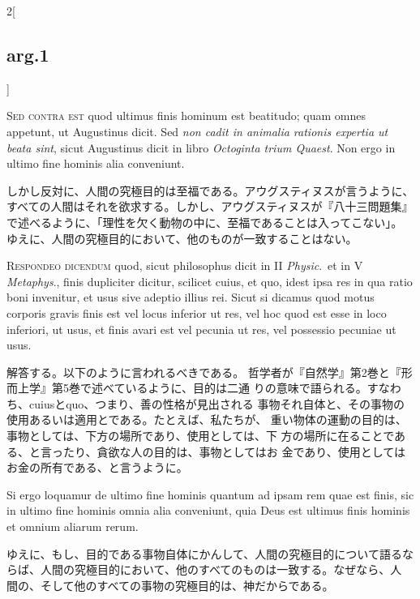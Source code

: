 \documentclass[paper=a4paper,fontsize=10pt,jafontsize=9pt,titlepage]{jlreq}
\begin{document}
\begin{paracol}{2}[\subsection{arg.1}]
\switchcolumn*[\subsection{s.c.}]

{\scshape Sed contra est} quod ultimus finis
hominum est beatitudo; quam omnes appetunt, ut Augustinus dicit. Sed {\itshape non
cadit in animalia rationis expertia ut beata sint}, sicut Augustinus
dicit in libro {\itshape Octoginta trium Quaest}. Non ergo in ultimo fine hominis
alia conveniunt.

\switchcolumn

しかし反対に、人間の究極目的は至福である。アウグスティヌスが言うように、
 すべての人間はそれを欲求する。しかし、アウグスティヌスが『八十三問題集』
 で述べるように、「理性を欠く動物の中に、至福であることは入ってこない」。
 ゆえに、人間の究極目的において、他のものが一致することはない。


{\scshape Respondeo dicendum} quod, sicut philosophus
dicit in II {\itshape Physic}.~et in V {\itshape Metaphys}., finis dupliciter dicitur,
scilicet cuius, et quo, idest ipsa res in qua ratio boni invenitur, et
usus sive adeptio illius rei. Sicut si dicamus quod motus corporis
gravis finis est vel locus inferior ut res, vel hoc quod est esse in
loco inferiori, ut usus, et finis avari est vel pecunia ut res, vel
possessio pecuniae ut usus.

\switchcolumn

解答する。以下のように言われるべきである。
哲学者が『自然学』第2巻と『形而上学』第5巻で述べているように、目的は二通
 りの意味で語られる。すなわち、cuiusとquo、つまり、善の性格が見出される
 事物それ自体と、その事物の使用あるいは適用とである。たとえば、私たちが、
重い物体の運動の目的は、事物としては、下方の場所であり、使用としては、下
 方の場所に在ることである、と言ったり、貪欲な人の目的は、事物としてはお
 金であり、使用としてはお金の所有である、と言うように。

\switchcolumn*

Si ergo loquamur de ultimo fine hominis
quantum ad ipsam rem quae est finis, sic in ultimo fine hominis omnia
alia conveniunt, quia Deus est ultimus finis hominis et omnium aliarum
rerum.

\switchcolumn

ゆえに、もし、目的である事物自体にかんして、人間の究極目的について語るな
 らば、人間の究極目的において、他のすべてのものは一致する。なぜなら、人
 間の、そして他のすべての事物の究極目的は、神だからである。


\end{paracol}
\end{document}
